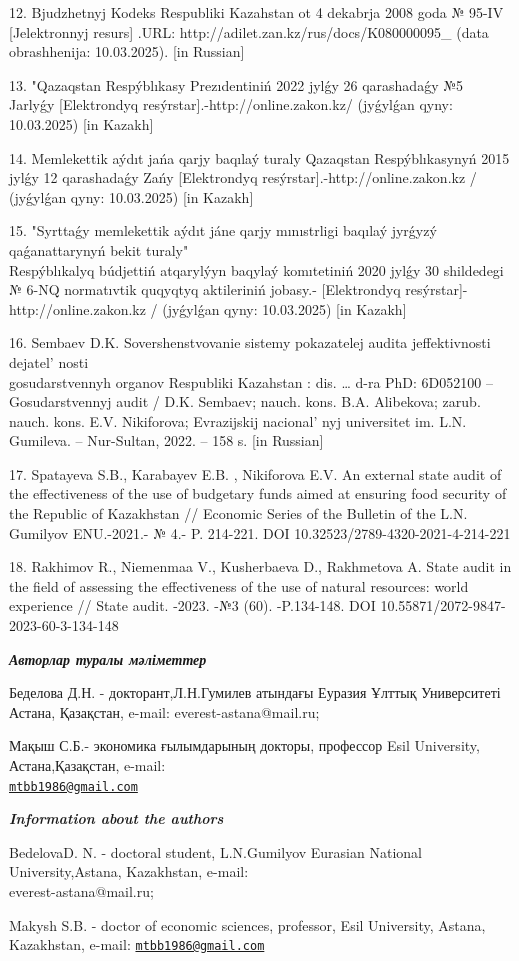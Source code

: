\begin{references}
12. Bjudzhetnyj Kodeks Respubliki Kazahstan ot 4 dekabrja 2008 goda №
95-IV {[}Jelektronnyj resurs{]} .URL:
http://adilet.zan.kz/rus/docs/K080000095\_ (data obrashhenija:
10.03.2025). {[}in Russian{]}

13. "Qazaqstan Respýblıkasy Prezıdentiniń 2022 jylǵy 26 qarashadaǵy №5
Jarlyǵy {[}Elektrondyq resýrstar{]}.-http://online.zakon.kz/ (jyǵylǵan
qyny: 10.03.2025) {[}in Kazakh{]}

14. Memlekettik aýdıt jańa qarjy baqılaý turaly Qazaqstan Respýblıkasynyń
2015 jylǵy 12 qarashadaǵy Zańy {[}Elektrondyq
resýrstar{]}.-http://online.zakon.kz / (jyǵylǵan qyny: 10.03.2025)
{[}in Kazakh{]}

15. "Syrttaǵy memlekettik aýdıt jáne qarjy mınıstrligi baqılaý jyrǵyzý
qaǵanattarynyń bekit turaly" \\Respýblıkalyq búdjettiń atqarylýyn
baqylaý komıtetiniń 2020 jylǵy 30 shildedegi № 6-NQ normatıvtik
quqyqtyq aktileriniń jobasy.- {[}Elektrondyq
resýrstar{]}-http://online.zakon.kz / (jyǵylǵan qyny: 10.03.2025)
{[}in Kazakh{]}

16. Sembaev D.K. Sovershenstvovanie sistemy pokazatelej audita
jeffektivnosti dejatel' nosti \\gosudarstvennyh organov
Respubliki Kazahstan : dis. \ldots{} d-ra PhD: 6D052100 --
Gosudarstvennyj audit / D.K. Sembaev; nauch. kons. B.A. Alibekova;
zarub. nauch. kons. E.V. Nikiforova; Evrazijskij
nacional' nyj universitet im. L.N. Gumileva. --
Nur-Sultan, 2022. -- 158 s. {[}in Russian{]}

17. Spatayeva S.B., Karabayev E.B. , Nikiforova E.V. An external state
audit of the effectiveness of the use of budgetary funds aimed at
ensuring food security of the Republic of Kazakhstan // Economic
Series of the Bulletin of the L.N. Gumilyov ENU.-2021.- № 4.- P.
214-221. DOI 10.32523/2789-4320-2021-4-214-221

18. Rakhimov R., Niemenmaa V., Kusherbaeva D., Rakhmetova A. State audit
in the field of assessing the effectiveness of the use of natural
resources: world experience // State audit. -2023. -№3 (60).
-P.134-148. DOI 10.55871/2072-9847-2023-60-3-134-148
\end{references}

\begin{authorinfo}
\emph{{\bfseries Авторлар туралы мәліметтер}}

Беделова Д.Н. - докторант,Л.Н.Гумилев атындағы Еуразия Ұлттық
Университеті Астана, Қазақстан, e-mail: everest-astana@mail.ru;

Мақыш С.Б.- экономика ғылымдарының докторы, профессор Esil University,
Астана,Қазақстан, e-mail:\\
\href{mailto:mtbb1986@gmail.com}{\nolinkurl{mtbb1986@gmail.com}}

\emph{{\bfseries Information about the authors}}

BedelovaD. N. - doctoral student, L.N.Gumilyov Eurasian National
University,Astana, Kazakhstan, e-mail:\\ everest-astana@mail.ru;

Makysh S.B. - doctor of economic sciences, professor, Esil University,
Astana, Kazakhstan, e-mail:
\href{mailto:mtbb1986@gmail.com}{\nolinkurl{mtbb1986@gmail.com}}
\end{authorinfo}
